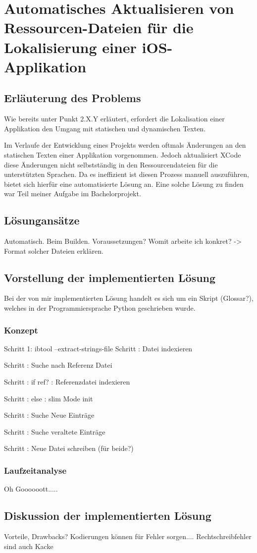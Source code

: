 %
\section{Automatisches Aktualisieren von Ressourcen-Dateien für die Lokalisierung einer iOS-Applikation}

\subsection{Erläuterung des Problems}

Wie bereits unter Punkt 2.X.Y erläutert, erfordert die Lokalisation einer Applikation den Umgang mit statischen und dynamischen Texten.

Im Verlaufe der Entwicklung eines Projekts werden oftmals Änderungen an den statischen Texten einer Applikation vorgenommen. Jedoch aktualisiert XCode diese Änderungen nicht selbstständig in den Ressourcendateien für die unterstützten Sprachen. Da es ineffizient ist diesen Prozess manuell auszuführen, bietet sich hierfür eine automatisierte Lösung an. Eine solche Lösung zu finden war Teil meiner Aufgabe im Bachelorprojekt.

\subsection{Lösungansätze}

Automatisch. Beim Builden. Voraussetzungen? Womit arbeite ich konkret? -> Format solcher Dateien erklären.

\subsection{Vorstellung der implementierten Lösung}

Bei der von mir implementierten Lösung handelt es sich um ein Skript (Glossar?), welches in der Programmiersprache Python geschrieben wurde.

\subsubsection{Konzept}

Schritt 1: ibtool --extract-strings-file
Schritt : Datei indexieren

Schritt : Suche nach Referenz Datei

Schritt : if ref? : Referenzdatei indexieren

Schritt : else : slim Mode init

Schritt : Suche Neue Einträge

Schritt : Suche veraltete Einträge

Schritt : Neue Datei schreiben (für beide?)

\subsubsection{Laufzeitanalyse}

Oh Goooooott.....

\subsection{Diskussion der implementierten Lösung}

Vorteile, Drawbacks? Kodierungen können für Fehler sorgen.... Rechtschreibfehler sind auch Kacke